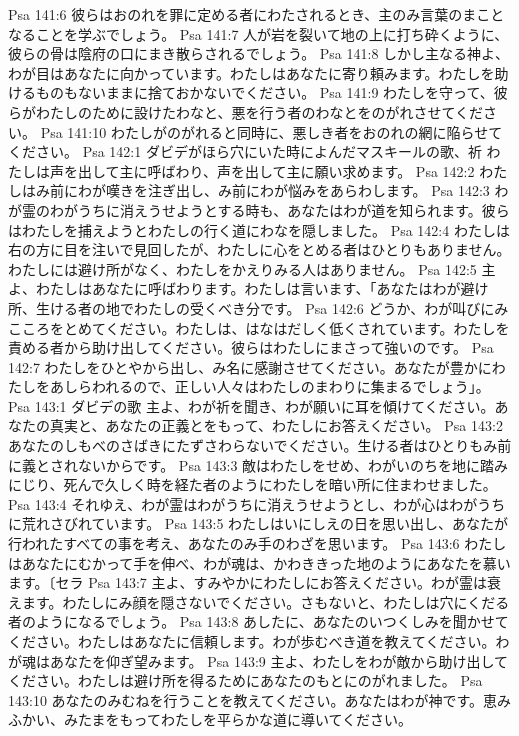Psa 141:6  彼らはおのれを罪に定める者にわたされるとき、主のみ言葉のまことなることを学ぶでしょう。
Psa 141:7  人が岩を裂いて地の上に打ち砕くように、彼らの骨は陰府の口にまき散らされるでしょう。
Psa 141:8  しかし主なる神よ、わが目はあなたに向かっています。わたしはあなたに寄り頼みます。わたしを助けるものもないままに捨ておかないでください。
Psa 141:9  わたしを守って、彼らがわたしのために設けたわなと、悪を行う者のわなとをのがれさせてください。
Psa 141:10  わたしがのがれると同時に、悪しき者をおのれの網に陥らせてください。
Psa 142:1  ダビデがほら穴にいた時によんだマスキールの歌、祈 わたしは声を出して主に呼ばわり、声を出して主に願い求めます。
Psa 142:2  わたしはみ前にわが嘆きを注ぎ出し、み前にわが悩みをあらわします。
Psa 142:3  わが霊のわがうちに消えうせようとする時も、あなたはわが道を知られます。彼らはわたしを捕えようとわたしの行く道にわなを隠しました。
Psa 142:4  わたしは右の方に目を注いで見回したが、わたしに心をとめる者はひとりもありません。わたしには避け所がなく、わたしをかえりみる人はありません。
Psa 142:5  主よ、わたしはあなたに呼ばわります。わたしは言います、「あなたはわが避け所、生ける者の地でわたしの受くべき分です。
Psa 142:6  どうか、わが叫びにみこころをとめてください。わたしは、はなはだしく低くされています。わたしを責める者から助け出してください。彼らはわたしにまさって強いのです。
Psa 142:7  わたしをひとやから出し、み名に感謝させてください。あなたが豊かにわたしをあしらわれるので、正しい人々はわたしのまわりに集まるでしょう」。
Psa 143:1  ダビデの歌 主よ、わが祈を聞き、わが願いに耳を傾けてください。あなたの真実と、あなたの正義とをもって、わたしにお答えください。
Psa 143:2  あなたのしもべのさばきにたずさわらないでください。生ける者はひとりもみ前に義とされないからです。
Psa 143:3  敵はわたしをせめ、わがいのちを地に踏みにじり、死んで久しく時を経た者のようにわたしを暗い所に住まわせました。
Psa 143:4  それゆえ、わが霊はわがうちに消えうせようとし、わが心はわがうちに荒れさびれています。
Psa 143:5  わたしはいにしえの日を思い出し、あなたが行われたすべての事を考え、あなたのみ手のわざを思います。
Psa 143:6  わたしはあなたにむかって手を伸べ、わが魂は、かわききった地のようにあなたを慕います。〔セラ
Psa 143:7  主よ、すみやかにわたしにお答えください。わが霊は衰えます。わたしにみ顔を隠さないでください。さもないと、わたしは穴にくだる者のようになるでしょう。
Psa 143:8  あしたに、あなたのいつくしみを聞かせてください。わたしはあなたに信頼します。わが歩むべき道を教えてください。わが魂はあなたを仰ぎ望みます。
Psa 143:9  主よ、わたしをわが敵から助け出してください。わたしは避け所を得るためにあなたのもとにのがれました。
Psa 143:10  あなたのみむねを行うことを教えてください。あなたはわが神です。恵みふかい、みたまをもってわたしを平らかな道に導いてください。
